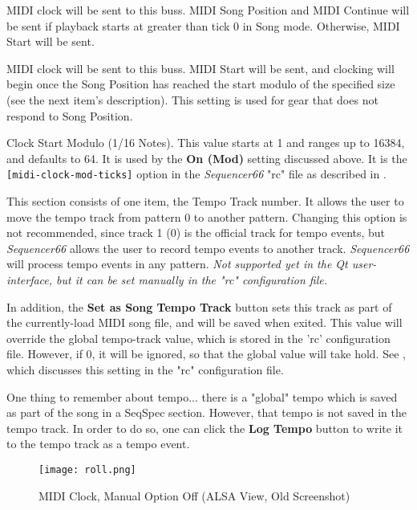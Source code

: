    MIDI clock will be sent to this buss.
   MIDI Song Position and MIDI Continue will be sent if playback starts
   at greater than tick 0 in Song mode.  Otherwise, MIDI Start will be sent.

   MIDI clock will be sent to this buss.
   MIDI Start will be sent, and clocking will begin
   once the Song Position has reached the start modulo of the specified size
   (see the next item's description).
   This setting is used for gear that does not respond to Song Position.

   Clock Start Modulo (1/16 Notes).
   This value starts at 1 and ranges up to 16384, and defaults to 64.
   It is used by the \textbf{On (Mod)} setting discussed above.
   It is the \texttt{[midi-clock-mod-ticks]} option in the \textsl{Sequencer66}
   "rc" file as described in
   .

   This section consists of one item, the Tempo Track number.
   It allows the user to move the tempo track from pattern 0 to
   another pattern.  Changing this option is not recommended, since track 1 (0)
   is the official track for tempo events, but \textsl{Sequencer66} allows the
   user to record tempo events to another track.  \textsl{Sequencer66} will
   process tempo events in any pattern.
   \textsl{Not supported yet in the Qt user-interface, but
   it can be set manually in the "rc" configuration file.}

   In addition, the \textbf{Set as Song Tempo Track} button sets this
   track as part of the currently-load MIDI song file, and will be saved when
   exited.  This value will override the global tempo-track value, which is
   stored in the 'rc' configuration file.  However, if 0, it will be ignored,
   so that the global value will take hold.
   See , which discusses this
   setting in the "rc" configuration file.

   One thing to remember about tempo...
   there is a "global" tempo which is saved as part of the song in a SeqSpec
   section.  However, that tempo is not saved in the tempo track.
   In order to do so, one can click the \textbf{Log Tempo} button to write it
   to the tempo track as a tempo event.

\begin{figure}[H]
   \centering 
   \texttt{[image: roll.png]}
   \caption{MIDI Clock, Manual Option Off (ALSA View, Old Screenshot)}
   \label{fig:seq66_midi_clock_4_devices_manual_0}
\end{figure}

